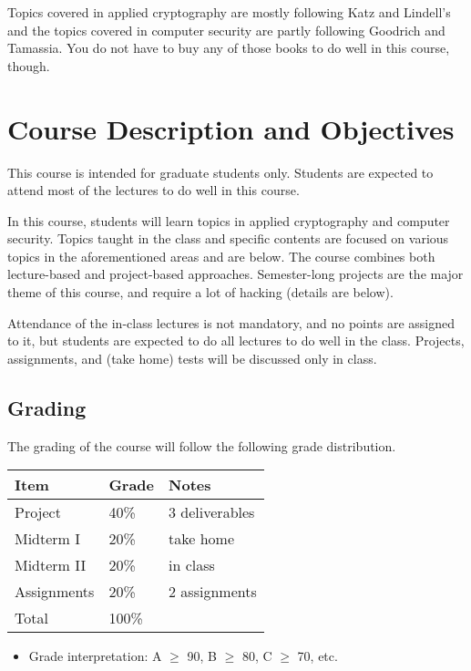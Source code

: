 \documentclass[11pt]{article}
\begin{document}
Topics covered in applied cryptography are mostly following Katz and Lindell's and the topics covered in computer security are partly following Goodrich and Tamassia. You do not have to buy any of those books to do well in this course, though. 

\section{Course Description and Objectives}

\noindent This course is intended for graduate students only. Students are expected to attend most of the lectures to do well in this course. 

In this course, students will learn topics in applied cryptography and computer security. Topics taught in the class and specific contents are focused on various topics in the aforementioned areas and are below. The course combines both lecture-based and project-based approaches. Semester-long projects are the major theme of this course, and require a lot of hacking (details are below).

Attendance of the in-class lectures is not mandatory, and no points are assigned to it, but students are expected to do all lectures to do well in the class. Projects, assignments, and (take home) tests will be discussed only in class.

\subsection{Grading}
The grading of the course will follow the following grade distribution. 
\begin{center}
\begin{tabular}{lll}
Item & Grade & Notes\\
\hline
Project & 40\% & 3 deliverables\\
\hline
Midterm I & 20\% & take home \\
\hline
Midterm II & 20\% & in class\\
\hline
Assignments & 20\% & 2 assignments\\
\hline
Total & 100\% & \\
\end{tabular}
\end{center}
\begin{itemize}
\item Grade interpretation: A $\geq$ 90, B $\geq$ 80, C $\geq$ 70, etc. 
\end{itemize}
\end{document}
